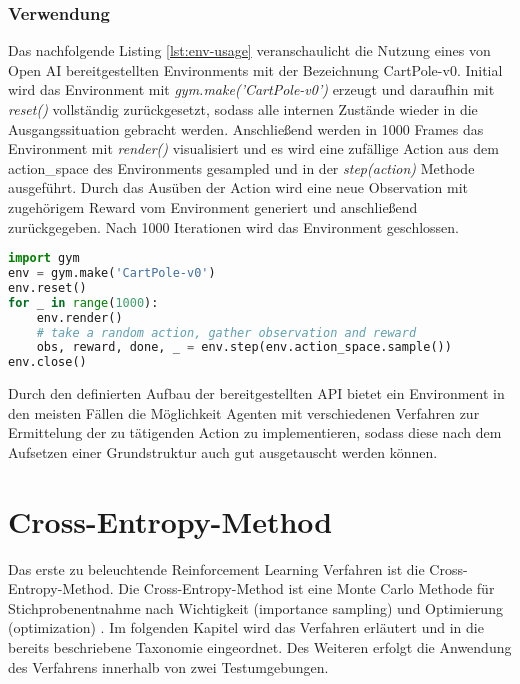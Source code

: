 \documentclass[11pt]{scrartcl}
\begin{document}
\subsubsection{Verwendung}
Das nachfolgende Listing \autoref{lst:env-usage} veranschaulicht die Nutzung eines von Open AI
bereitgestellten Environments mit der Bezeichnung CartPole-v0. Initial wird das Environment
mit \textit{gym.make('CartPole-v0')} erzeugt und daraufhin mit \textit{reset()} vollständig
zurückgesetzt, sodass alle internen Zustände wieder in die Ausgangssituation gebracht werden. 
Anschließend werden in 1000 Frames das Environment mit \textit{render()} visualisiert und es
wird eine zufällige Action aus dem action\_space des Environments gesampled und in der
\textit{step(action)} Methode ausgeführt. Durch das Ausüben der Action wird eine neue
Observation mit zugehörigem Reward vom Environment generiert und anschließend zurückgegeben.
Nach 1000 Iterationen wird das Environment geschlossen. 
\begin{lstlisting}[language=Python, caption=environment usage, label=lst:env-usage]
import gym
env = gym.make('CartPole-v0')
env.reset()
for _ in range(1000):
    env.render()
    # take a random action, gather observation and reward
    obs, reward, done, _ = env.step(env.action_space.sample())
env.close()
\end{lstlisting}

\noindent
Durch den definierten Aufbau der bereitgestellten API bietet ein Environment in den meisten Fällen
die Möglichkeit Agenten mit verschiedenen Verfahren zur Ermittelung der zu tätigenden Action zu
implementieren, sodass diese nach dem Aufsetzen einer Grundstruktur auch gut ausgetauscht werden
können.


\newpage
\section{Cross-Entropy-Method}
\label{sec:cross-entropy-method}
Das erste zu beleuchtende Reinforcement Learning Verfahren ist die Cross-Entropy-Method. Die
Cross-Entropy-Method ist eine Monte Carlo Methode für Stichprobenentnahme nach Wichtigkeit
(importance sampling) und Optimierung (optimization) \cite[~S.29 ff.]{R2004}. Im folgenden
Kapitel wird das Verfahren erläutert und in die bereits beschriebene Taxonomie eingeordnet.
Des Weiteren erfolgt die Anwendung des Verfahrens innerhalb von zwei Testumgebungen. 
\end{document}

